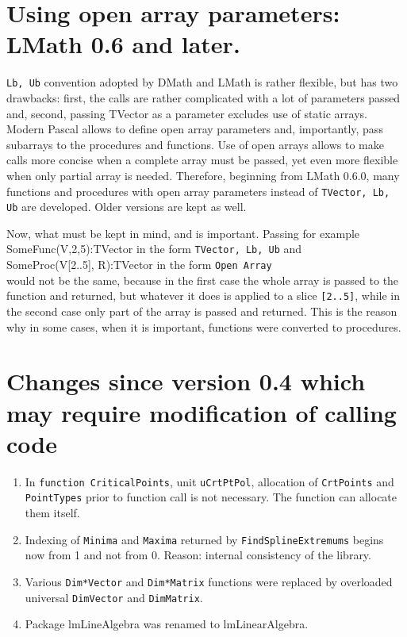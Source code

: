 \documentclass[12pt,a4paper,oneside]{article}
\newcommand{\code}[1]{\texttt{#1}}
\begin{document}
\section{Using open array parameters: LMath 0.6 and later.}
\code{Lb, Ub} convention adopted by DMath and LMath is rather flexible, but has two drawbacks: first, the calls are rather complicated with a lot of parameters passed and, second, passing TVector as a parameter excludes use of static arrays. Modern Pascal allows to define open array parameters and, importantly, pass subarrays to the procedures and functions. Use of open arrays allows to make calls more concise when a complete array must be passed, yet even more flexible when only partial array is needed. Therefore, beginning from LMath 0.6.0, many functions and procedures with open array parameters instead of \code{TVector, Lb, Ub} are developed. Older versions are kept as well.

Now, what must be kept in mind, and is important. Passing for example \\
SomeFunc(V,2,5):TVector in the form \code{TVector, Lb, Ub} and \\
SomeProc(V[2..5], R):TVector in the form \code{Open Array} \\ would not be the same, because in the first case the whole array is passed to the function and returned, but whatever it does is applied to a slice \code{[2..5]}, while in the second case only part of the array is passed and returned. This is the reason why in some cases, when it is important, functions were converted to procedures.  
  
\section{Changes since version 0.4 which may require modification of calling code}
\begin{enumerate}
	\item In \code{function CriticalPoints}, unit \code{uCrtPtPol}, allocation of \code{CrtPoints} and \code{PointTypes} prior to function call is not necessary. The function can allocate them itself.
	\item Indexing of \code{Minima} and \code{Maxima} returned by \code{FindSplineExtremums} begins now from 1 and not from 0. Reason: internal consistency of the library.
	\item Various \code{Dim*Vector} and \code{Dim*Matrix} functions were replaced by overloaded universal \code{DimVector} and \code{DimMatrix}.
	\item Package lmLineAlgebra was renamed to lmLinearAlgebra.  
\end{enumerate}
\end{document}
